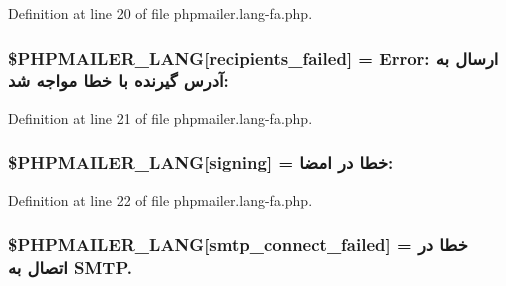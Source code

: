 Definition at line 20 of file phpmailer.\+lang-\/fa.\+php.

\subsubsection[{\texorpdfstring{\$\+P\+H\+P\+M\+A\+I\+L\+E\+R\+\_\+\+L\+A\+NG}{$PHPMAILER_LANG}}]{\setlength{\rightskip}{0pt plus 5cm}\$P\+H\+P\+M\+A\+I\+L\+E\+R\+\_\+\+L\+A\+NG\mbox{[}\textquotesingle{}recipients\+\_\+failed\textquotesingle{}\mbox{]} =  Error\+: ارسال به آدرس گیرنده با خطا مواجه شد\+: \textquotesingle{}}\hypertarget{phpmailer_8lang-fa_8php_a7589d30bb9b368327c2df015f3e6bcba}{}\label{phpmailer_8lang-fa_8php_a7589d30bb9b368327c2df015f3e6bcba}


Definition at line 21 of file phpmailer.\+lang-\/fa.\+php.

\subsubsection[{\texorpdfstring{\$\+P\+H\+P\+M\+A\+I\+L\+E\+R\+\_\+\+L\+A\+NG}{$PHPMAILER_LANG}}]{\setlength{\rightskip}{0pt plus 5cm}\$P\+H\+P\+M\+A\+I\+L\+E\+R\+\_\+\+L\+A\+NG\mbox{[}\textquotesingle{}signing\textquotesingle{}\mbox{]} = \textquotesingle{}خطا در امضا\+: \textquotesingle{}}\hypertarget{phpmailer_8lang-fa_8php_a68e437bdb9b968a5a67320f03d231565}{}\label{phpmailer_8lang-fa_8php_a68e437bdb9b968a5a67320f03d231565}


Definition at line 22 of file phpmailer.\+lang-\/fa.\+php.

\subsubsection[{\texorpdfstring{\$\+P\+H\+P\+M\+A\+I\+L\+E\+R\+\_\+\+L\+A\+NG}{$PHPMAILER_LANG}}]{\setlength{\rightskip}{0pt plus 5cm}\$P\+H\+P\+M\+A\+I\+L\+E\+R\+\_\+\+L\+A\+NG\mbox{[}\textquotesingle{}smtp\+\_\+connect\+\_\+failed\textquotesingle{}\mbox{]} = \textquotesingle{}خطا در اتصال به S\+M\+T\+P.\textquotesingle{}}\hypertarget{phpmailer_8lang-fa_8php_a7b321d4ca1e9df702403ed4c61aa0980}{}\label{phpmailer_8lang-fa_8php_a7b321d4ca1e9df702403ed4c61aa0980}


